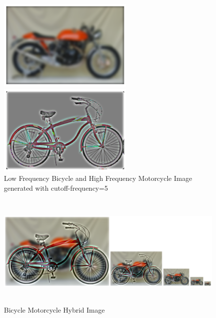 \documentclass[12pt]{report}
\begin{document}
\begin{figure}[H]
    \centering
    \begin{minipage}{0.45\textwidth}
            \centering
            \includegraphics[height=12em]{./images/motorcycle_low.png}
        \end{minipage}
        \begin{minipage}{0.45\textwidth}
            \centering
            \includegraphics[height=12em]{./images/bicycle_high.png}
        \end{minipage}
        \caption{Low Frequency Bicycle and High Frequency Motorcycle Image generated with cutoff-frequency=5}
        \label{bicycle_motorcycle_low_high}
\end{figure}
\begin{figure}[H]
    \centering
        \includegraphics[height=15em]{./images/motorcycle_bicycle_hybrid.png}
        \caption{Bicycle Motorcycle Hybrid Image}
        \label{bicycle_motorcycle_hybrid}
\end{figure}
\end{document}
